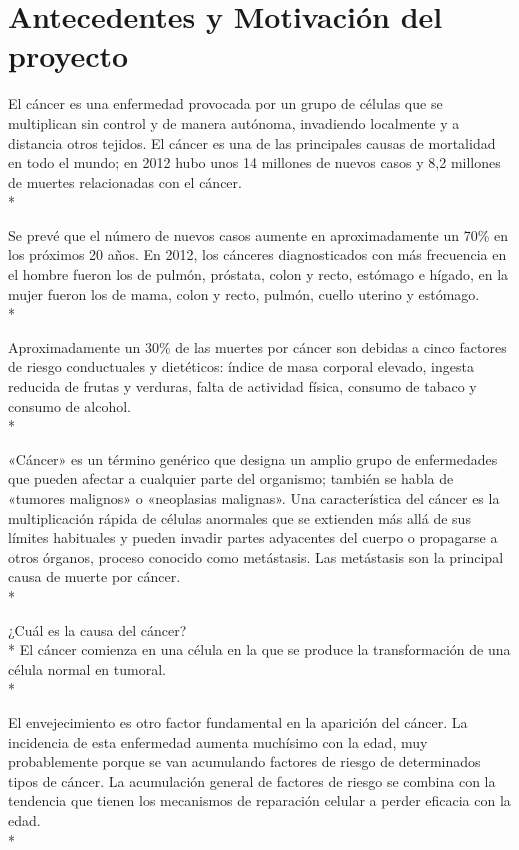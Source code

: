 \documentclass[../pfc.tex]{subfiles}
\begin{document}
\section{Antecedentes y Motivación del proyecto}
El cáncer es una enfermedad provocada por un grupo de células que se multiplican sin control y de manera autónoma, invadiendo localmente y a distancia otros tejidos. El cáncer es una de las principales causas de mortalidad en todo el mundo; en 2012 hubo unos 14 millones de nuevos casos y 8,2 millones de muertes relacionadas con el cáncer.\\*

Se prevé que el número de nuevos casos aumente en aproximadamente un 70\% en los próximos 20 años. En 2012, los cánceres diagnosticados con más frecuencia en el hombre fueron los de pulmón, próstata, colon y recto, estómago e hígado, en la mujer fueron los de mama, colon y recto, pulmón, cuello uterino y estómago.\cite{omsintro}\\*

Aproximadamente un 30\% de las muertes por cáncer son debidas a cinco factores de riesgo conductuales y dietéticos: índice de masa corporal elevado, ingesta reducida de frutas y verduras, falta de actividad física, consumo de tabaco y consumo de alcohol.\\*

«Cáncer» es un término genérico que designa un amplio grupo de enfermedades que pueden afectar a cualquier parte del organismo; también se habla de «tumores malignos» o «neoplasias malignas». Una característica del cáncer es la multiplicación rápida de células anormales que se extienden más allá de sus límites habituales y pueden invadir partes adyacentes del cuerpo o propagarse a otros órganos, proceso conocido como metástasis. Las metástasis son la principal causa de muerte por cáncer.\\*

¿Cuál es la causa del cáncer?\\*
El cáncer comienza en una célula en la que se produce la transformación de una célula normal en tumoral.\\*

El envejecimiento es otro factor fundamental en la aparición del cáncer. La incidencia de esta enfermedad aumenta muchísimo con la edad, muy probablemente porque se van acumulando factores de riesgo de determinados tipos de cáncer. La acumulación general de factores de riesgo se combina con la tendencia que tienen los mecanismos de reparación celular a perder eficacia con la edad.\\*
\end{document}
